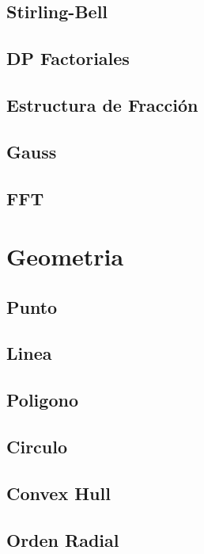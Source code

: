 \documentclass[a4paper,11pt,landscape,twocolumn]{article}
\begin{document}
\subsection{Stirling-Bell}

\subsection{DP Factoriales}

\subsection{Estructura de Fracción}

\subsection{Gauss}

\subsection{FFT}


\section{Geometria} %
\subsection{Punto}

\subsection{Linea}

\subsection{Poligono}

\subsection{Circulo}

\subsection{Convex Hull}

\subsection{Orden Radial}

\end{document}

